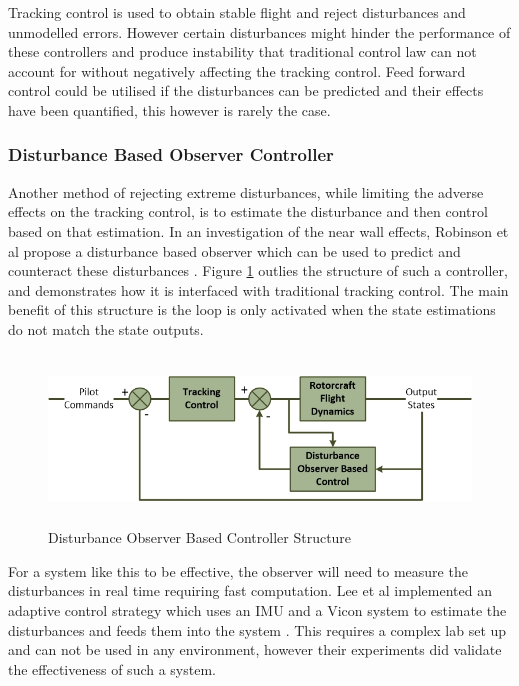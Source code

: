 	Tracking control is used to obtain stable flight and reject disturbances and unmodelled errors. However certain disturbances might hinder the performance of these controllers and produce instability that traditional control law can not account for without negatively affecting the tracking control. Feed forward control could be utilised if the disturbances can be predicted and their effects have been quantified, this however is rarely the case.   
	
			\subsubsection{Disturbance Based Observer Controller}\label{SectionDisturbanceObserver}
			Another method of rejecting extreme disturbances, while limiting the adverse effects on the tracking control, is to estimate the disturbance and then control based on that estimation. In an investigation of the near wall effects, Robinson et al propose a disturbance based observer which can be used to predict and counteract these disturbances \cite{NearWall, Robinson2016}. Figure \ref{IM_DOBC} outlies the structure of such a controller, and demonstrates how it is interfaced with traditional tracking control. The main benefit of this structure is the loop is only activated when the state estimations do not match the state outputs. 
			
			\begin{figure}[H]
				\centering
				\includegraphics[height = 4.5cm]{../References/Diagrams/DOBC}     
				\caption{Disturbance Observer Based Controller Structure}
				\label{IM_DOBC}
			\end{figure}
			
			For a system like this to be effective, the observer will need to measure the disturbances in real time requiring fast computation. Lee et al implemented an adaptive control strategy which uses an IMU and a Vicon system to estimate the disturbances and feeds them into the system \cite{Lee2012}. This requires a complex lab set up and can not be used in any environment, however their experiments did validate the effectiveness of such a system.
	
